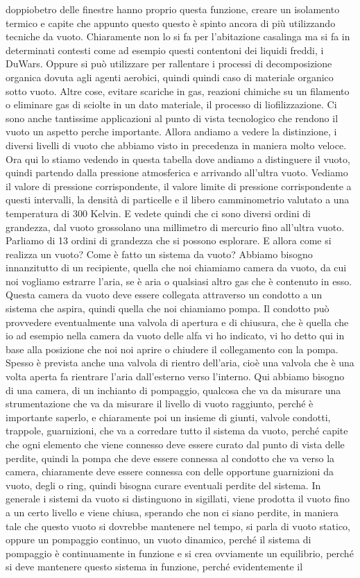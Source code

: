 doppiobetro delle finestre hanno proprio questa funzione, creare un isolamento termico e capite che appunto questo questo è spinto ancora di più utilizzando tecniche da vuoto. Chiaramente non lo si fa per l'abitazione casalinga ma si fa in determinati contesti come ad esempio questi contentoni dei liquidi freddi, i DuWars. Oppure si può utilizzare per rallentare i processi di decomposizione organica dovuta agli agenti aerobici, quindi quindi caso di materiale organico sotto vuoto. Altre cose, evitare scariche in gas, reazioni chimiche su un filamento o eliminare gas di sciolte in un dato materiale, il processo di liofilizzazione. Ci sono anche tantissime applicazioni al punto di vista tecnologico che rendono il vuoto un aspetto perche importante. Allora andiamo a vedere la distinzione, i diversi livelli di vuoto che abbiamo visto in precedenza in maniera molto veloce. Ora qui lo stiamo vedendo in questa tabella dove andiamo a distinguere il vuoto, quindi partendo dalla pressione atmosferica e arrivando all'ultra vuoto. Vediamo il valore di pressione corrispondente, il valore limite di pressione corrispondente a questi intervalli, la densità di particelle e il libero camminometrio valutato a una temperatura di 300 Kelvin. E vedete quindi che ci sono diversi ordini di grandezza, dal vuoto grossolano una millimetro di mercurio fino all'ultra vuoto. Parliamo di 13 ordini di grandezza che si possono esplorare. E allora come si realizza un vuoto? Come è fatto un sistema da vuoto? Abbiamo bisogno innanzitutto di un recipiente, quella che noi chiamiamo camera da vuoto, da cui noi vogliamo estrarre l'aria, se è aria o qualsiasi altro gas che è contenuto in esso. Questa camera da vuoto deve essere collegata attraverso un condotto a un sistema che aspira, quindi quella che noi chiamiamo pompa. Il condotto può provvedere eventualmente una valvola di apertura e di chiusura, che è quella che io ad esempio nella camera da vuoto delle alfa vi ho indicato, vi ho detto qui in base alla posizione che noi noi aprire o chiudere il collegamento con la pompa. Spesso è prevista anche una valvola di rientro dell'aria, cioè una valvola che è una volta aperta fa rientrare l'aria dall'esterno verso l'interno. Qui abbiamo bisogno di una camera, di un inchianto di pompaggio, qualcosa che va da misurare una strumentazione che va da misurare il livello di vuoto raggiunto, perché è importante saperlo, e chiaramente poi un insieme di giunti, valvole condotti, trappole, guarnizioni, che va a corredare tutto il sistema da vuoto, perché capite che ogni elemento che viene connesso deve essere curato dal punto di vista delle perdite, quindi la pompa che deve essere connessa al condotto che va verso la camera, chiaramente deve essere connessa con delle opportune guarnizioni da vuoto, degli o ring, quindi bisogna curare eventuali perdite del sistema. In generale i sistemi da vuoto si distinguono in sigillati, viene prodotta il vuoto fino a un certo livello e viene chiusa, sperando che non ci siano perdite, in maniera tale che questo vuoto si dovrebbe mantenere nel tempo, si parla di vuoto statico, oppure un pompaggio continuo, un vuoto dinamico, perché il sistema di pompaggio è continuamente in funzione e si crea ovviamente un equilibrio, perché si deve mantenere questo sistema in funzione, perché evidentemente il 